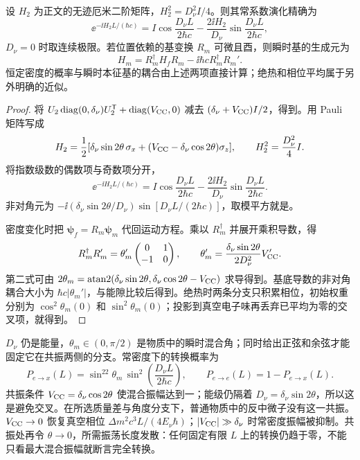 \begin{proposition}[二能级矩阵指数与可变酉基的导数]
设 $H_2$ 为正文的无迹厄米二阶矩阵，$H_2^2=D_\nu^2I/4$。则其常系数演化精确为
\[
\ee^{-\ii H_2L/(\hbar c)}
=I\cos\frac{D_\nu L}{2\hbar c}
-\frac{2\ii H_2}{D_\nu}\sin\frac{D_\nu L}{2\hbar c},
\]
$D_\nu=0$ 时取连续极限。若位置依赖的基变换 $R_m$ 可微且酉，则瞬时基的生成元为
\[
H_m=R_m^\dagger H_fR_m-\ii\hbar cR_m^\dagger R_m'.
\]
恒定密度的概率与瞬时本征基的耦合由上述两项直接计算；绝热和相位平均属于另外明确的近似。
\end{proposition}
\begin{proof}
将 $U_2\operatorname{diag}(0,\delta_\nu)U_2^{\mathsf T}+\operatorname{diag}(V_{\rm CC},0)$ 减去 $(\delta_\nu+V_{\rm CC})I/2$，得到。用 Pauli 矩阵写成
\begin{equation*}
 H_2=\frac12[\delta_\nu\sin2\theta\,\sigma_x+
 (V_{\rm CC}-\delta_\nu\cos2\theta)\sigma_z],\qquad
 H_2^2=\frac{D_\nu^2}{4}I.
\end{equation*}
将指数级数的偶数项与奇数项分开，
\begin{equation*}
 \ee^{-\ii H_2L/(\hbar c)}
 =I\cos\frac{D_\nu L}{2\hbar c}
 -\frac{2\ii H_2}{D_\nu}\sin\frac{D_\nu L}{2\hbar c}.
\end{equation*}
非对角元为 $-\ii(\delta_\nu\sin2\theta/D_\nu)\sin[D_\nu L/(2\hbar c)]$，取模平方就是。

密度变化时把 $\boldsymbol\psi_f=R_m\boldsymbol\psi_m$ 代回运动方程。乘以 $R_m^\dagger$ 并展开乘积导数，得
\begin{equation*}
 R_m^\dagger R_m'=\theta_m'\begin{pmatrix}0&1\\-1&0\end{pmatrix},\qquad
 \theta_m'=\frac{\delta_\nu\sin2\theta}{2D_\nu^2}V_{\rm CC}'.
\end{equation*}
第二式可由 $2\theta_m=\operatorname{atan2}(\delta_\nu\sin2\theta,\delta_\nu\cos2\theta-V_{\rm CC})$ 求导得到。基底导数的非对角耦合大小为 $\hbar c|\theta_m'|$，与能隙比较后得到。绝热时两条分支只积累相位，初始权重分别为 $\cos^2\theta_m(0)$ 和 $\sin^2\theta_m(0)$；投影到真空电子味再丢弃已平均为零的交叉项，就得到。
\end{proof}

$D_\nu$ 仍是能量，$\theta_m\in(0,\pi/2)$ 是物质中的瞬时混合角；同时给出正弦和余弦才能固定它在共振两侧的分支。常密度下的转换概率为
\begin{equation}
 P_{e\to x}(L)=\sin^22\theta_m\,
 \sin^2\!\left(\frac{D_\nu L}{2\hbar c}\right),\qquad
 P_{e\to e}(L)=1-P_{e\to x}(L).
 \label{eq:sm-matter-constant-probability}
\end{equation}
共振条件 $V_{\rm CC}=\delta_\nu\cos2\theta$ 使混合振幅达到一；能级仍隔着 $D_\nu=\delta_\nu\sin2\theta$，所以这是避免交叉。在所选质量差与角度分支下，普通物质中的反中微子没有这一共振。$V_{\rm CC}\to0$ 恢复真空相位 $\Delta m^2c^3L/(4E_\nu\hbar)$；$|V_{\rm CC}|\gg\delta_\nu$ 时常密度振幅被抑制。共振处再令 $\theta\to0$，所需振荡长度发散：任何固定有限 $L$ 上的转换仍趋于零，不能只看最大混合振幅就断言完全转换。


